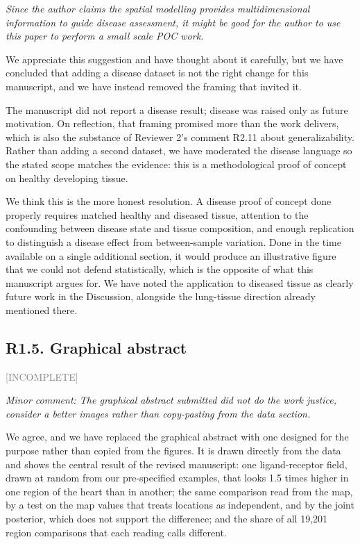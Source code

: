 \documentclass[11pt]{article}
\newcommand{\status}[1]{\textcolor{gray}{\small\textsf{[#1]}}}
\newenvironment{rev}{\begin{leftbar}\itshape\small}{\end{leftbar}}
\begin{document}
\begin{rev}
Since the author claims the spatial modelling provides multidimensional information to
guide disease assessment, it might be good for the author to use this paper to perform a
small scale POC work.
\end{rev}

\noindent We appreciate this suggestion and have thought about it carefully, but we have
concluded that adding a disease dataset is not the right change for this manuscript, and
we have instead removed the framing that invited it.

The manuscript did not report a disease result; disease was raised only as future
motivation. On reflection, that framing promised more than the work delivers, which is
also the substance of Reviewer 2's comment R2.11 about generalizability. Rather than
adding a second dataset, we have moderated the disease language so the stated scope
matches the evidence: this is a methodological proof of concept on healthy developing
tissue.

We think this is the more honest resolution. A disease proof of concept done properly
requires matched healthy and diseased tissue, attention to the confounding between disease
state and tissue composition, and enough replication to distinguish a disease effect from
between-sample variation. Done in the time available on a single additional section, it
would produce an illustrative figure that we could not defend statistically, which is the
opposite of what this manuscript argues for. We have noted the application to diseased
tissue as clearly future work in the Discussion, alongside the lung-tissue direction
already mentioned there.

\subsection{R1.5. Graphical abstract} \status{INCOMPLETE}

\begin{rev}
Minor comment: The graphical abstract submitted did not do the work justice, consider a
better images rather than copy-pasting from the data section.
\end{rev}

\noindent We agree, and we have replaced the graphical abstract with one designed for the
purpose rather than copied from the figures. It is drawn directly from the data and shows the
central result of the revised manuscript: one ligand-receptor field, drawn at random from our
pre-specified examples, that looks 1.5 times higher in one region of the heart than in another; the
same comparison read from the map, by a test on the map values that treats locations as
independent, and by the joint posterior, which does not support the difference; and the share of all 19,201 region
comparisons that each reading calls different.
\end{document}
